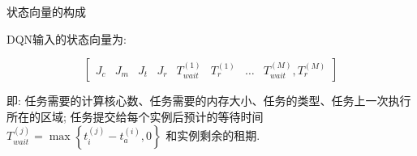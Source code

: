 \begin{frame}{状态向量的构成}

    DQN输入的状态向量为:

    \begin{equation*}
        \begin{bmatrix}
            J_c & J_m & J_t & J_r & T_{wait}^{(1)} & T_r^{(1)} & \dots & T_{wait}^{(M)}, T_r^{(M)}
        \end{bmatrix}
    \end{equation*}

    即: 任务需要的计算核心数、任务需要的内存大小、任务的类型、任务上一次执行所在的区域; 任务提交给每个实例后预计的等待时间 $T_{wait}^{(j)} = \max \left\{t_i^{(j)} - t_a^{(i)}, 0\right\}$ 和实例剩余的租期.
\end{frame}
